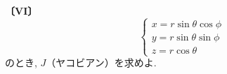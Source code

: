 \noindent\textbf{〔VI〕}
\[
\begin{cases}
x=r\sin\theta\cos\phi\\
y=r\sin\theta\sin\phi\\
z=r\cos\theta
\end{cases}
\]
のとき, $J$（ヤコビアン）を求めよ.
